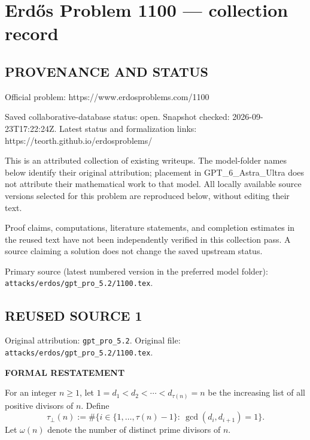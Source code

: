 \section*{Erd\H{o}s Problem 1100 --- collection record}

\subsection*{PROVENANCE AND STATUS}
Official problem: https://www.erdosproblems.com/1100

Saved collaborative-database status: open.
Snapshot checked: 2026-09-23T17:22:24Z.
Latest status and formalization links: https://teorth.github.io/erdosproblems/

This is an attributed collection of existing writeups. The model-folder names below identify their original attribution; placement in GPT\_6\_Astra\_Ultra does not attribute their mathematical work to that model. All locally available source versions selected for this problem are reproduced below, without editing their text.

Proof claims, computations, literature statements, and completion estimates in the reused text have not been independently verified in this collection pass. A source claiming a solution does not change the saved upstream status.

Primary source (latest numbered version in the preferred model folder): \texttt{attacks/erdos/gpt\_pro\_5.2/1100.tex}.

\subsection*{REUSED SOURCE 1}
Original attribution: \texttt{gpt\_pro\_5.2}.
Original file: \texttt{attacks/erdos/gpt\_pro\_5.2/1100.tex}.


\medskip
\noindent\textbf{FORMAL RESTATEMENT}

\smallskip
\noindent
For an integer $n\ge 1$, let $1=d_1<d_2<\cdots<d_{\tau(n)}=n$ be the increasing list of all positive divisors of $n$.
Define
\[
\tau_\perp(n):=\#\{i\in\{1,\dots,\tau(n)-1\}:\ \gcd(d_i,d_{i+1})=1\}.
\]
Let $\omega(n)$ denote the number of distinct prime divisors of $n$.

